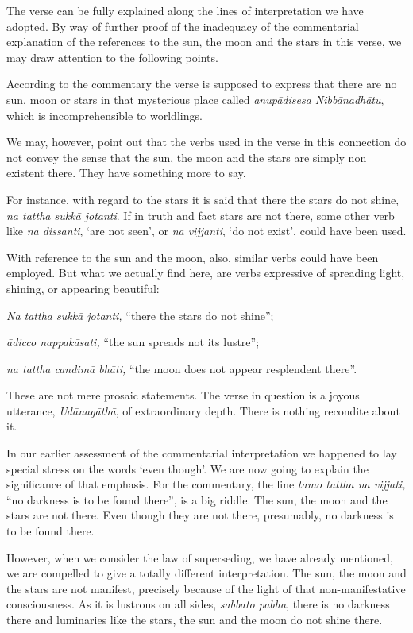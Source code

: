 The verse can be fully explained along the lines of interpretation we have adopted. By way of further proof of the inadequacy of the commentarial explanation of the references to the sun, the moon and the stars in this verse, we may draw attention to the following points.

According to the commentary the verse is supposed to express that there are no sun, moon or stars in that mysterious place called \emph{anupādisesa Nibbānadhātu}, which is incomprehensible to worldlings.

We may, however, point out that the verbs used in the verse in this connection do not convey the sense that the sun, the moon and the stars are simply non existent there. They have something more to say.

For instance, with regard to the stars it is said that there the stars do not shine, \emph{na tattha sukkā jotanti}. If in truth and fact stars are not there, some other verb like \emph{na dissanti}, `are not seen', or \emph{na vijjanti}, `do not exist', could have been used.

With reference to the sun and the moon, also, similar verbs could have been employed. But what we actually find here, are verbs expressive of spreading light, shining, or appearing beautiful:

\emph{Na tattha sukkā jotanti,} ``there the stars do not shine'';

\emph{ādicco nappakāsati,} ``the sun spreads not its lustre'';

\emph{na tattha candimā bhāti,} ``the moon does not appear resplendent there''.

These are not mere prosaic statements. The verse in question is a joyous utterance, \emph{Udānagāthā}, of extraordinary depth. There is nothing recondite about it.

In our earlier assessment of the commentarial interpretation we happened to lay special stress on the words `even though'. We are now going to explain the significance of that emphasis. For the commentary, the line \emph{tamo tattha na vijjati,} ``no darkness is to be found there'', is a big riddle. The sun, the moon and the stars are not there. Even though they are not there, presumably, no darkness is to be found there.

However, when we consider the law of superseding, we have already mentioned, we are compelled to give a totally different interpretation. The sun, the moon and the stars are not manifest, precisely because of the light of that non-manifestative consciousness. As it is lustrous on all sides, \emph{sabbato pabha}, there is no darkness there and luminaries like the stars, the sun and the moon do not shine there.

